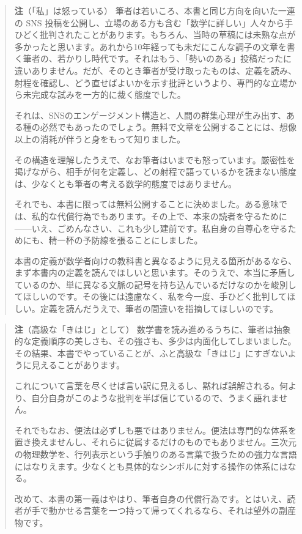 \documentclass[a4paper,12pt,openany]{book}
\begin{document}
\begin{quote}
\textbf{注}（「私」は怒っている）
筆者は若いころ、本書と同じ方向を向いた一連の SNS
投稿を公開し、立場のある方も含む「数学に詳しい」人々から手ひどく批判されたことがあります。もちろん、当時の草稿には未熟な点が多かったと思います。あれから10年経っても未だにこんな調子の文章を書く筆者の、若かりし時代です。それはもう、「勢いのある」投稿だったに違いありません。だが、そのとき筆者が受け取ったものは、定義を読み、射程を確認し、どう直せばよいかを示す批評というより、専門的な立場から未完成な試みを一方的に裁く態度でした。

それは、SNSのエンゲージメント構造と、人間の群集心理が生み出す、ある種の必然でもあったのでしょう。無料で文章を公開することには、想像以上の消耗が伴うと身をもって知りました。

その構造を理解したうえで、なお筆者はいまでも怒っています。厳密性を掲げながら、相手が何を定義し、どの射程で語っているかを読まない態度は、少なくとも筆者の考える数学的態度ではありません。

それでも、本書に限っては無料公開することに決めました。ある意味では、私的な代償行為でもあります。その上で、本来の読者を守るために——いえ、ごめんなさい、これも少し建前です。私自身の自尊心を守るためにも、精一杯の予防線を張ることにしました。

本書の定義が数学者向けの教科書と異なるように見える箇所があるなら、まず本書内の定義を読んでほしいと思います。そのうえで、本当に矛盾しているのか、単に異なる文脈の記号を持ち込んでいるだけなのかを峻別してほしいのです。その後には遠慮なく、私を今一度、手ひどく批判してほしい。定義を読んだうえで、筆者の間違いを指摘してほしいのです。
\end{quote}

\begin{quote}
\textbf{注}（高級な「きはじ」として）
数学書を読み進めるうちに、筆者は抽象的な定義順序の美しさも、その強さも、多少は内面化してしまいました。その結果、本書でやっていることが、ふと高級な「きはじ」にすぎないように見えることがあります。

これについて言葉を尽くせば言い訳に見えるし、黙れば誤解される。何より、自分自身がこのような批判を半ば信じているので、うまく語れません。

それでもなお、便法は必ずしも悪ではありません。便法は専門的な体系を置き換えませんし、それらに従属するだけのものでもありません。三次元の物理数学を、行列表示という手触りのある言葉で扱うための強力な言語にはなりえます。少なくとも具体的なシンボルに対する操作の体系にはなる。

改めて、本書の第一義はやはり、筆者自身の代償行為です。とはいえ、読者が手で動かせる言葉を一つ持って帰ってくれるなら、それは望外の副産物です。
\end{quote}
\end{document}
